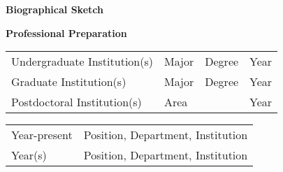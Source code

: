 \renewcommand{\thepage}{Biographical Sketch:  - Page \arabic{page} of 2}







\setcounter{page}{1}
\renewcommand{\thepage}{Biographical Sketch - Page \arabic{page} of 2}
\begin{center}
\textbf{\large Biographical Sketch}
\end{center}


{\bf Professional Preparation}

\begin{tabular}{llll}
Undergraduate Institution(s) \hspace{0.5in} & Major \hspace{1in} & Degree  \hspace{0.25in} & Year \\
Graduate Institution(s)                     & Major              & Degree                  & Year \\
Postdoctoral Institution(s)                 & Area               &                         & Year
\end{tabular}





\begin{tabular}{ll}
Year-present & Position, Department, Institution \\
Year(s)      & Position, Department, Institution \\
\end{tabular}

